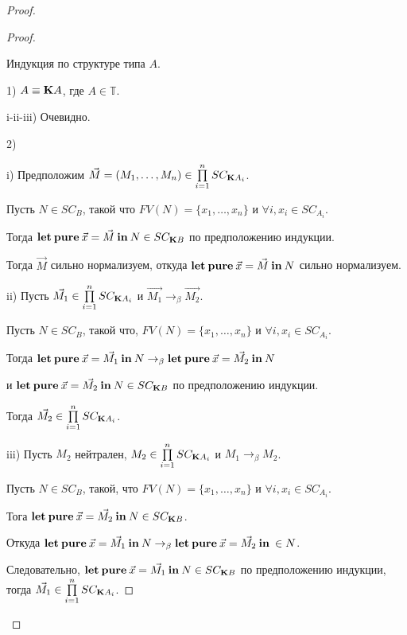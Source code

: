 \begin{proof}
\begin{proof}
$ $

Индукция по структуре типа $A$.

1) $A \equiv {\bf K}A$, где $A \in \mathbb{T}$.

i-ii-iii) Очевидно.

  \vspace{\baselineskip}

2)

i) Предположим $\vec{M} = (M_1,\dots,M_n) \in \prod \limits_{i = 1}^{n} SC_{{\bf K}A_i}$.

Пусть $N \in SC_{B}$, такой что $FV(N) = \{ x_1,\dots, x_n \}$ и $\forall i, x_i \in SC_{A_i}$.

Тогда ${\bf let \: pure \:} \vec{x} = \vec{M} {\: \bf in \: } N \in SC_{{\bf K}B}$ по предположению индукции.

Тогда $\vec{M}$ сильно нормализуем, откуда ${\bf let \: pure \:} \vec{x} = \vec{M} {\: \bf in \: } N$ сильно нормализуем.

\vspace{\baselineskip}

ii) Пусть $\vec{M_1} \in \prod \limits_{i = 1}^{n} SC_{{\bf K}A_i}$ и $\vec{M_1} \rightarrow_{\beta} \vec{M_2}$.

Пусть $N \in SC_{B}$, такой что, $FV(N) = \{ x_1,\dots,x_n \}$ и $\forall i, x_i \in SC_{A_i}$.

Тогда ${\bf let \: pure \:} \vec{x} = \vec{M_1} {\: \bf in \:} N \rightarrow_{\beta} {\bf let \: pure \:} \vec{x} = \vec{M_2} {\: \bf in \:} N$

и ${\bf let \: pure \:} \vec{x} = \vec{M_2} {\: \bf in \:} N \in SC_{{\bf K}B}$ по предположению индукции.

Тогда $\vec{M_2} \in \prod \limits_{i = 1}^{n} SC_{{\bf K}A_i}$.

iii) Пусть $M_2$ нейтрален, $M_2 \in \prod \limits_{i = 1}^{n} SC_{{\bf K}A_i}$ и $M_1 \rightarrow_{\beta} M_2$.

Пусть $N \in SC_{B}$, такой, что $FV(N) = \{ x_1,\dots,x_n \}$ и $\forall i, x_i \in SC_{A_i}$.

Тога ${\bf let \: pure \:} \vec{x} = \vec{M_2} {\: \bf in \:} N \in SC_{{\bf K}B}$.

Откуда ${\bf let \: pure \:} \vec{x} = \vec{M_1} {\: \bf in \:} N \rightarrow_{\beta} {\bf let \: pure \:} \vec{x} = \vec{M_2} {\: \bf in \:} \in N$.

Следовательно, ${\bf let \: pure \:} \vec{x} = \vec{M_1} {\: \bf in \:} N\in SC_{{\bf K}B}$ по предположению индукции, тогда $\vec{M_1} \in \prod \limits_{i = 1}^{n} SC_{{\bf K}A_i}$.
\end{proof}


\end{proof}
